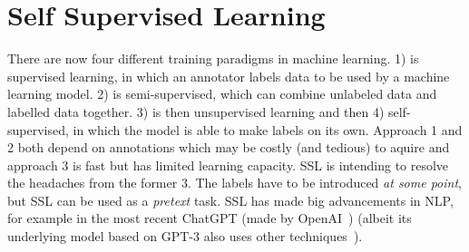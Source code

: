 \documentclass[10pt,twocolumn,letterpaper]{article}
\begin{document}
\section{Self Supervised Learning}\label{sec:ssl}

There are now four different training paradigms in machine learning. 1) is supervised learning, in which an annotator labels data to be used by a machine learning model. 2) is semi-supervised, which can combine unlabeled data and labelled data together. 3) is then unsupervised learning and then 4) self-supervised, in which the model is able to make labels on its own. Approach 1 and 2 both depend on annotations which may be costly (and tedious) to aquire and approach 3 is fast but has limited learning capacity. \gls{SSL} is intending to resolve the headaches from the former 3. The labels have to be introduced \textit{at some point}, but \gls{SSL} can be used as a \textit{pretext} task. \gls{SSL} has made big advancements in \gls{NLP}, for example in the most recent ChatGPT (made by OpenAI~\cite{openAI}) (albeit its underlying model based on GPT-3 also uses other techniques~\cite{gpt3}).
\end{document}
